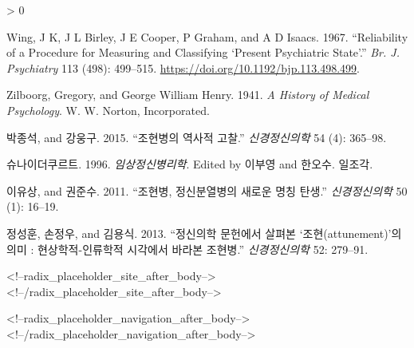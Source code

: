\documentclass[
]{article}
\newlength{\cslhangindent}
\newenvironment{CSLReferences}[2] %
 {%
  \setlength{\parindent}{0pt}
  \ifodd #1 \everypar{\setlength{\hangindent}{\cslhangindent}}\ignorespaces\fi
  \ifnum #2 > 0
  \setlength{\parskip}{#2\baselineskip}
  \fi
 }%
 {}
\begin{document}
\begin{CSLReferences}{1}{0}
\leavevmode\hypertarget{ref-Wing1967-ka}{}%
Wing, J K, J L Birley, J E Cooper, P Graham, and A D Isaacs. 1967.
{``Reliability of a Procedure for Measuring and Classifying {`Present
Psychiatric State'}.''} \emph{Br. J. Psychiatry} 113 (498): 499--515.
\url{https://doi.org/10.1192/bjp.113.498.499}.

\leavevmode\hypertarget{ref-Zilboorg1941-nx}{}%
Zilboorg, Gregory, and George William Henry. 1941. \emph{A History of
Medical Psychology}. W. W. Norton, Incorporated.

\leavevmode\hypertarget{ref-2015-aw}{}%
박종석, and 강웅구. 2015. {``조현병의 역사적 고찰.''}
\emph{신경정신의학} 54 (4): 365--98.

\leavevmode\hypertarget{ref-1996-jj}{}%
슈나이더쿠르트. 1996. \emph{임상정신병리학}. Edited by 이부영 and
한오수. 일조각.

\leavevmode\hypertarget{ref-2011-ub}{}%
이유상, and 권준수. 2011. {``조현병, 정신분열병의 새로운 명칭 탄생.''}
\emph{신경정신의학} 50 (1): 16--19.

\leavevmode\hypertarget{ref-2013-pe}{}%
정성훈, 손정우, and 김용식. 2013. {``정신의학 문헌에서 살펴본
{`조현(attunement)'}의 의미 : 현상학적-인류학적 시각에서 바라본
조현병.''} \emph{신경정신의학} 52: 279--91.

\end{CSLReferences}

<!--radix_placeholder_site_after_body-->
<!--/radix_placeholder_site_after_body-->

<!--radix_placeholder_navigation_after_body-->
<!--/radix_placeholder_navigation_after_body-->
\end{document}
